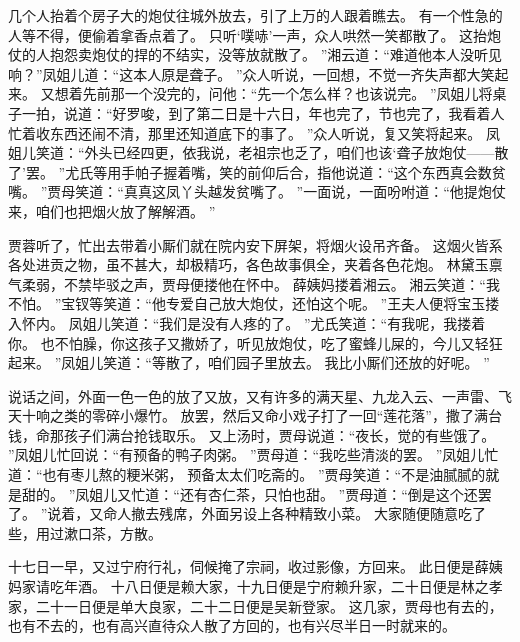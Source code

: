 几个人抬着个房子大的炮仗往城外放去，引了上万的人跟着瞧去。
有一个性急的人等不得，便偷着拿香点着了。
只听‘噗哧’一声，众人哄然一笑都散了。
这抬炮仗的人抱怨卖炮仗的捍的不结实，没等放就散了。
”湘云道：“难道他本人没听见响？”凤姐儿道：“这本人原是聋子。
”众人听说，一回想，不觉一齐失声都大笑起来。
又想着先前那一个没完的，问他：“先一个怎么样？也该说完。
”凤姐儿将桌子一拍，说道：“好罗唆，到了第二日是十六日，年也完了，节也完了，我看着人忙着收东西还闹不清，那里还知道底下的事了。
”众人听说，复又笑将起来。
凤姐儿笑道：“外头已经四更，依我说，老祖宗也乏了，咱们也该‘聋子放炮仗——散了’罢。
”尤氏等用手帕子握着嘴，笑的前仰后合，指他说道：“这个东西真会数贫嘴。
”贾母笑道：“真真这凤丫头越发贫嘴了。
”一面说，一面吩咐道：“他提炮仗来，咱们也把烟火放了解解酒。
”\par
贾蓉听了，忙出去带着小厮们就在院内安下屏架，将烟火设吊齐备。
这烟火皆系各处进贡之物，虽不甚大，却极精巧，各色故事俱全，夹着各色花炮。
林黛玉禀气柔弱，不禁毕驳之声，贾母便搂他在怀中。
薛姨妈搂着湘云。
湘云笑道：“我不怕。
”宝钗等笑道：“他专爱自己放大炮仗，还怕这个呢。
”王夫人便将宝玉搂入怀内。
凤姐儿笑道：“我们是没有人疼的了。
”尤氏笑道：“有我呢，我搂着你。
也不怕臊，你这孩子又撒娇了，听见放炮仗，吃了蜜蜂儿屎的，今儿又轻狂起来。
”凤姐儿笑道：“等散了，咱们园子里放去。
我比小厮们还放的好呢。
”\par
说话之间，外面一色一色的放了又放，又有许多的满天星、九龙入云、一声雷、飞天十响之类的零碎小爆竹。
放罢，然后又命小戏子打了一回“莲花落”，撒了满台钱，命那孩子们满台抢钱取乐。
又上汤时，贾母说道：“夜长，觉的有些饿了。
”凤姐儿忙回说：“有预备的鸭子肉粥。
”贾母道：“我吃些清淡的罢。
”凤姐儿忙道：“也有枣儿熬的粳米粥，
预备太太们吃斋的。
”贾母笑道：“不是油腻腻的就是甜的。
”凤姐儿又忙道：“还有杏仁茶，只怕也甜。
”贾母道：“倒是这个还罢了。
”说着，又命人撤去残席，外面另设上各种精致小菜。
大家随便随意吃了些，用过漱口茶，方散。
\par
十七日一早，又过宁府行礼，伺候掩了宗祠，收过影像，方回来。
此日便是薛姨妈家请吃年酒。
十八日便是赖大家，十九日便是宁府赖升家，二十日便是林之孝家，二十一日便是单大良家，二十二日便是吴新登家。
这几家，贾母也有去的，也有不去的，也有高兴直待众人散了方回的，也有兴尽半日一时就来的。
